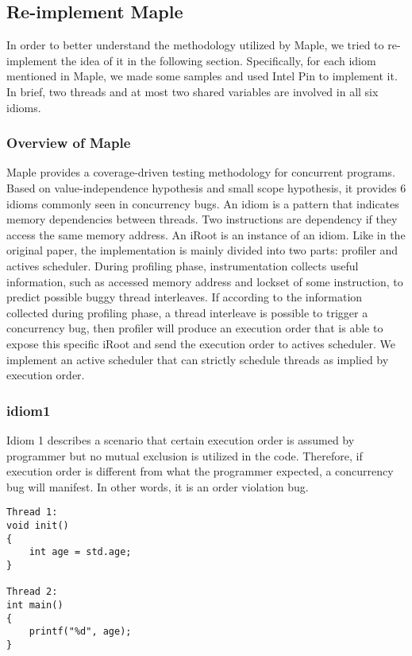 \documentclass[twocolumn]{article}
\begin{document}
\subsection{Re-implement Maple}
In order to better understand the methodology utilized by Maple, we tried to re-implement the idea of it in the following section. Specifically, for each idiom mentioned in Maple, we made some samples and used Intel Pin to implement it. In brief, two threads and at most two shared variables are involved in all six idioms. 

\subsubsection{Overview of Maple}
Maple provides a coverage-driven testing methodology for concurrent programs. Based on value-independence hypothesis and small scope hypothesis, it provides 6 idioms commonly seen in concurrency bugs. An idiom is a pattern that indicates memory dependencies between threads. Two instructions are dependency if they access the same memory address. An iRoot is an instance of an idiom. Like in the original paper, the implementation is mainly divided into two parts: profiler and actives scheduler. During profiling phase, instrumentation collects useful information, such as accessed memory address and lockset of some instruction, to predict possible buggy thread interleaves. If according to the information collected during profiling phase, a thread interleave is possible to trigger a concurrency bug, then profiler will produce an execution order that is able to expose this specific iRoot and send the execution order to actives scheduler. We implement an active scheduler that can strictly schedule threads as implied by execution order. 

\subsubsection{idiom1}
Idiom 1 describes a scenario that certain execution order is assumed by programmer but no mutual exclusion is utilized in the code. Therefore, if execution order is different from what the programmer expected, a concurrency bug will manifest. In other words, it is an order violation bug. 

\begin{lstlisting}
Thread 1:
void init()
{
	int age = std.age;
}

Thread 2:
int main()
{
	printf("%d", age);
}
\end{lstlisting}
\end{document}
